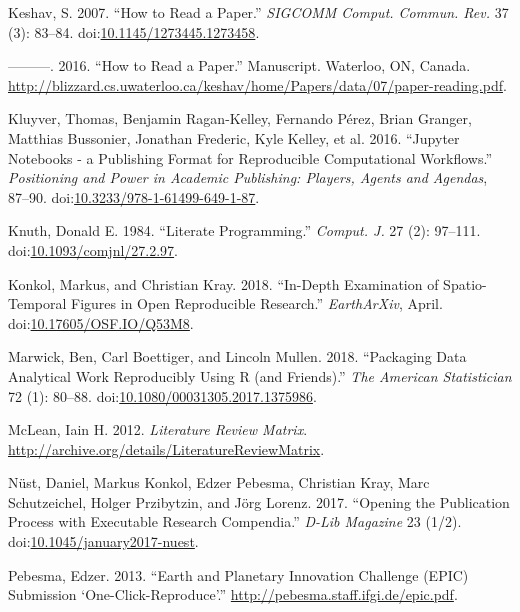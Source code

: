 \documentclass[fleqn,10pt]{wlpeerj} %
\begin{document}
\hypertarget{ref-keshav_how_2007}{}
Keshav, S. 2007. ``How to Read a Paper.'' \emph{SIGCOMM Comput. Commun.
Rev.} 37 (3): 83--84.
doi:\href{https://doi.org/10.1145/1273445.1273458}{10.1145/1273445.1273458}.

\hypertarget{ref-keshav_how_2016}{}
---------. 2016. ``How to Read a Paper.'' Manuscript. Waterloo, ON,
Canada.
\url{http://blizzard.cs.uwaterloo.ca/keshav/home/Papers/data/07/paper-reading.pdf}.

\hypertarget{ref-kluyver_jupyter_2016}{}
Kluyver, Thomas, Benjamin Ragan-Kelley, Fernando Pérez, Brian Granger,
Matthias Bussonier, Jonathan Frederic, Kyle Kelley, et al. 2016.
``Jupyter Notebooks - a Publishing Format for Reproducible Computational
Workflows.'' \emph{Positioning and Power in Academic Publishing:
Players, Agents and Agendas}, 87--90.
doi:\href{https://doi.org/10.3233/978-1-61499-649-1-87}{10.3233/978-1-61499-649-1-87}.

\hypertarget{ref-knuth_literate_1984}{}
Knuth, Donald E. 1984. ``Literate Programming.'' \emph{Comput. J.} 27
(2): 97--111.
doi:\href{https://doi.org/10.1093/comjnl/27.2.97}{10.1093/comjnl/27.2.97}.

\hypertarget{ref-konkol_-depth_2018}{}
Konkol, Markus, and Christian Kray. 2018. ``In-Depth Examination of
Spatio-Temporal Figures in Open Reproducible Research.''
\emph{EarthArXiv}, April.
doi:\href{https://doi.org/10.17605/OSF.IO/Q53M8}{10.17605/OSF.IO/Q53M8}.

\hypertarget{ref-marwick_packaging_2018}{}
Marwick, Ben, Carl Boettiger, and Lincoln Mullen. 2018. ``Packaging Data
Analytical Work Reproducibly Using R (and Friends).'' \emph{The American
Statistician} 72 (1): 80--88.
doi:\href{https://doi.org/10.1080/00031305.2017.1375986}{10.1080/00031305.2017.1375986}.

\hypertarget{ref-mclean_literature_2012}{}
McLean, Iain H. 2012. \emph{Literature Review Matrix}.
\url{http://archive.org/details/LiteratureReviewMatrix}.

\hypertarget{ref-nust_opening_2017}{}
Nüst, Daniel, Markus Konkol, Edzer Pebesma, Christian Kray, Marc
Schutzeichel, Holger Przibytzin, and Jörg Lorenz. 2017. ``Opening the
Publication Process with Executable Research Compendia.'' \emph{D-Lib
Magazine} 23 (1/2).
doi:\href{https://doi.org/10.1045/january2017-nuest}{10.1045/january2017-nuest}.

\hypertarget{ref-pebesma_earth_2013}{}
Pebesma, Edzer. 2013. ``Earth and Planetary Innovation Challenge (EPIC)
Submission `One-Click-Reproduce'.''
\url{http://pebesma.staff.ifgi.de/epic.pdf}.
\end{document}
